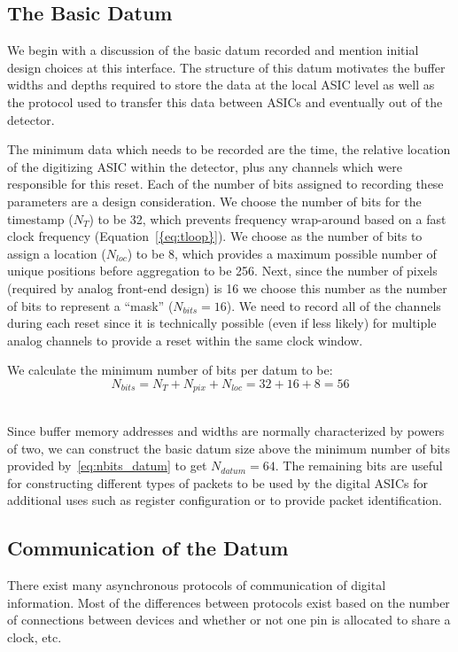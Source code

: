 \subsection{The Basic Datum}

We begin with a discussion of the basic datum recorded and mention initial design choices at this interface.
The structure of this datum motivates the buffer widths and depths required to store the data at the local ASIC level as well as the protocol used to transfer this data between ASICs and eventually out of the detector.

The minimum data which needs to be recorded are the time, the relative location of the digitizing ASIC within the detector, plus any channels which were responsible for this reset.
Each of the number of bits assigned to recording these parameters are a design consideration.
We choose the number of bits for the timestamp ($N_{T}$) to be 32, which prevents frequency wrap-around based on a fast clock frequency (Equation~\ref{{eq:tloop}}).
We choose as the number of bits to assign a location ($N_{loc}$) to be 8, which provides a maximum possible number of unique positions before aggregation to be 256.
Next, since the number of pixels (required by analog front-end design) is 16 we choose this number as the number of bits to represent a ``mask'' ($N_{bits} = 16$).
We need to record all of the channels during each reset since it is technically possible (even if less likely) for multiple analog channels to provide a reset within the same clock window.

We calculate the minimum number of bits per datum to be:
\begin{equation}
  N_{bits} = N_{T} + N_{pix} + N_{loc} = 32 + 16 + 8 = 56
\end{equation}~\label{eq:nbits_datum}

Since buffer memory addresses and widths are normally characterized by powers of two, we can construct the basic datum size above the minimum number of bits provided by~\ref{eq:nbits_datum} to get $N_{datum} = 64$.
The remaining bits are useful for constructing different types of packets to be used by the digital ASICs for additional uses such as register configuration or to provide packet identification.

\subsection{Communication of the Datum}

There exist many asynchronous protocols of communication of digital information.
Most of the differences between protocols exist based on the number of connections between devices and whether or not one pin is allocated to share a clock, etc.


